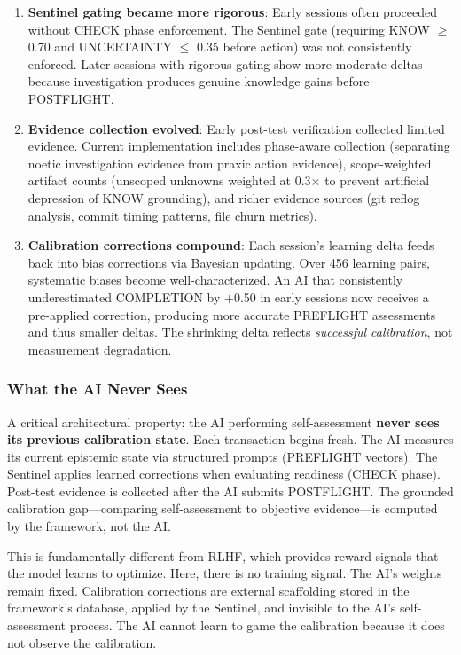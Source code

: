 \begin{enumerate}
    \item \textbf{Sentinel gating became more rigorous}: Early sessions often proceeded without CHECK phase enforcement. The Sentinel gate (requiring KNOW $\geq$ 0.70 and UNCERTAINTY $\leq$ 0.35 before action) was not consistently enforced. Later sessions with rigorous gating show more moderate deltas because investigation produces genuine knowledge gains before POSTFLIGHT.

    \item \textbf{Evidence collection evolved}: Early post-test verification collected limited evidence. Current implementation includes phase-aware collection (separating noetic investigation evidence from praxic action evidence), scope-weighted artifact counts (unscoped unknowns weighted at 0.3$\times$ to prevent artificial depression of KNOW grounding), and richer evidence sources (git reflog analysis, commit timing patterns, file churn metrics).

    \item \textbf{Calibration corrections compound}: Each session's learning delta feeds back into bias corrections via Bayesian updating. Over 456 learning pairs, systematic biases become well-characterized. An AI that consistently underestimated COMPLETION by +0.50 in early sessions now receives a pre-applied correction, producing more accurate PREFLIGHT assessments and thus smaller deltas. The shrinking delta reflects \emph{successful calibration}, not measurement degradation.
\end{enumerate}

\subsubsection{What the AI Never Sees}

A critical architectural property: the AI performing self-assessment \textbf{never sees its previous calibration state}. Each transaction begins fresh. The AI measures its current epistemic state via structured prompts (PREFLIGHT vectors). The Sentinel applies learned corrections when evaluating readiness (CHECK phase). Post-test evidence is collected after the AI submits POSTFLIGHT. The grounded calibration gap---comparing self-assessment to objective evidence---is computed by the framework, not the AI.

This is fundamentally different from RLHF, which provides reward signals that the model learns to optimize. Here, there is no training signal. The AI's weights remain fixed. Calibration corrections are external scaffolding stored in the framework's database, applied by the Sentinel, and invisible to the AI's self-assessment process. The AI cannot learn to game the calibration because it does not observe the calibration.

